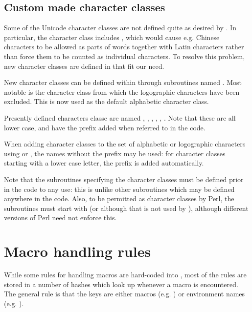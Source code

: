 \documentclass{article}
\begin{document}
\subsection{Custom made character classes}

Some of the Unicode character classes are not defined quite as desired by \TeXcount{}. In particular, the  character class includes , which would cause e.g. Chinese characters to be allowed as parts of words together with Latin characters rather than force them to be counted as individual characters. To resolve this problem, new character classes are defined in \TeXcount{} that fit our need.

New character classes can be defined within \TeXcount{} through subroutines named . Most notable is the  character class from which the logographic characters have been excluded. This is now used as the default alphabetic character class.

Presently defined characters classe are named , , , , , . Note that these are all lower case, and have the prefix  added when referred to in the code.

When adding character classes to the set of alphabetic or logographic characters using  or , the names without the prefix  may be used: for character classes starting with a lower case letter, the prefix is added automatically.

Note that the subroutines specifying the character classes must be defined prior in the code to any use: this is unlike other subroutines which may be defined anywhere in the code. Also, to be permitted as character classes by Perl, the subroutines must start with  (or  although that is not used by \TeXcount{}), although different versions of Perl need not enforce this.



\section{Macro handling rules}

While some rules for handling macros are hard-coded into \TeXcount{}, most of the rules are stored in a number of hashes which \TeXcount{} look up whenever a macro is encountered. The general rule is that the keys are either macros (e.g. ) or environment names (e.g. ).
\end{document}
